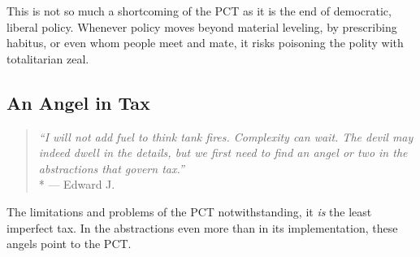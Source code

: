 This is not so much a shortcoming of the PCT as it is the end of democratic, liberal policy.
Whenever policy moves beyond material leveling, by prescribing habitus, or even whom people meet and mate, it risks poisoning the polity with totalitarian zeal.
\subsection{An Angel in Tax}

\begin{quote}
	\emph{``I will not add fuel to think tank fires.
	Complexity can wait.
	The devil may indeed dwell in the details, but we first need to find an angel or two in the abstractions that govern tax.''}
	\\*
	--- Edward J.\ \citet[6f.]{McCaffery2002}
\end{quote}

The limitations and problems of the PCT notwithstanding, it \emph{is} the least imperfect tax.
In the abstractions even more than in its implementation, these angels point to the PCT.







